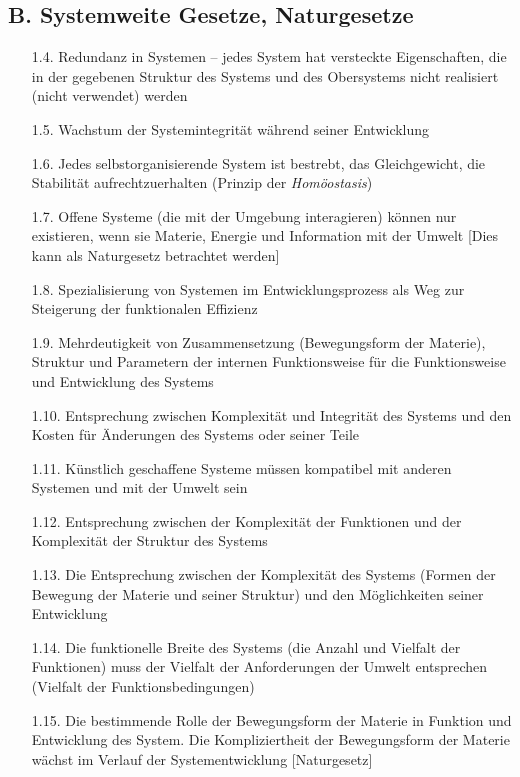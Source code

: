 \documentclass[11pt,a4paper]{article}
\begin{document}
\subsection*{B. Systemweite Gesetze, Naturgesetze}
\begin{itemize}\itemsep0pt
\item[1.4.] Redundanz in Systemen -- jedes System hat versteckte
  Eigenschaften, die in der gegebenen Struktur des Systems und des
  Obersystems nicht realisiert (nicht verwendet) werden
\item[1.5.] Wachstum der Systemintegrität während seiner Entwicklung
\item[1.6.] Jedes selbstorganisierende System ist bestrebt, das Gleichgewicht,
  die Stabilität aufrechtzuerhalten (Prinzip der \emph{Homöostasis})
\item[1.7.] Offene Systeme (die mit der Umgebung interagieren) können nur
  existieren, wenn sie Materie, Energie und Information mit der Umwelt [Dies
    kann als Naturgesetz betrachtet werden]
\item[1.8.] Spezialisierung von Systemen im Entwicklungsprozess als Weg zur
  Steigerung der funktionalen Effizienz
\item[1.9.] Mehrdeutigkeit von Zusammensetzung (Bewegungsform der Materie),
  Struktur und Parametern der internen Funktionsweise für die Funktionsweise
  und Entwicklung des Systems
\item[1.10.] Entsprechung zwischen Komplexität und Integrität des Systems
  und den Kosten für Änderungen des Systems oder seiner Teile
\item[1.11.] Künstlich geschaffene Systeme müssen kompatibel mit anderen
  Systemen und mit der Umwelt sein
\item[1.12.] Entsprechung zwischen der Komplexität der Funktionen und der
  Komplexität der Struktur des Systems
\item[1.13.] Die Entsprechung zwischen der Komplexität des Systems (Formen der
  Bewegung der Materie und seiner Struktur) und den Möglichkeiten seiner
  Entwicklung
\item[1.14.] Die funktionelle Breite des Systems (die Anzahl und Vielfalt der
  Funktionen) muss der Vielfalt der Anforderungen der Umwelt entsprechen
  (Vielfalt der Funktionsbedingungen)
\item[1.15.] Die bestimmende Rolle der Bewegungsform der Materie in Funktion
  und Entwicklung des System. Die Kompliziertheit der Bewegungsform der
  Materie wächst im Verlauf der Systementwicklung [Naturgesetz]
\end{itemize}
\end{document}
